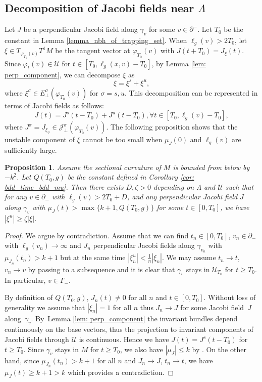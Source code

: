 \documentclass[10pt]{amsart}
\newcommand{\elg}{\ell_g}
\newtheorem{proposition}[theorem]{Proposition}
\theoremstyle{definition}
\let\phi\varphi
\renewcommand{\>}{{\rangle}}
\newcommand{\<}{{\langle}}
\begin{document}
\subsection{Decomposition of Jacobi fields near \texorpdfstring{$\Lambda$}{La}}

Let $J$ be a perpendicular Jacobi field along $\gamma_v$ for some $v\in\partial^-$. Let $T_0$ be the constant in Lemma \ref{lemma_nbh_of_trapping_set}. When $\elg(v)>2T_0$, let $\xi\in T_{\phi_{T_0}(v)}T^1M$ be the tangent vector at $\phi_{T_0}(v)$ with $J(t+T_0)=J_{\xi}(t)$. Since $\phi_{t}(v)\in \mathcal U$ for $t\in [T_0, \elg(x,v)-T_0]$, by Lemma \ref{lem: perp_component}, we can decompose $\xi$ as
\[
\xi=\xi^s+\xi^u,
\]
where $\xi^{\sigma}\in E^{\sigma}_{\perp}(\phi_{T_0}(v))$ for $\sigma= s,u$.
This decomposition can be represented in terms of Jacobi fields as follows:
\[
J(t)=J^s(t-T_0)+J^u(t-T_0), \forall t\in [T_0, \elg(v)-T_0],
\]
where $J^{\sigma}=J_{\xi_{\sigma}}\in \mathcal{J}^{\sigma}_{\perp}(\phi_{T_0}(v))$. The following proposition shows that the unstable component of $\xi$ cannot be too small when $\mu_J(0)$ and $\elg(v)$ are sufficiently large.

\begin{proposition}\label{prop: big_unstable_comp}
Assume the sectional curvature of $M$ is bounded from below by $-k^2$. Let $Q(T_0,g)$ be the constant defined in Corollary \ref{cor: bdd_time_bdd_mu}. Then there exists $D, \zeta>0$ depending on $\Lambda$ and $\mathcal{U}$ such that for any $v\in\partial_-$ with $\elg(v)>2T_0+D$, and any perpendicular Jacobi field $J$ along $\gamma_v$ with $\mu_J(t)>\max\{k+1, Q(T_0,g)\}$ for some $t\in[0,T_0]$, we have $|\xi^u|\geq \zeta |\xi|$.
\end{proposition}

\begin{proof}
We argue by contradiction. Assume that we can find $t_n\in[0,T_0]$, $v_n\in\partial_-$ with $\elg(v_n)\to\infty$ and $J_n$ perpendicular Jacobi fields along $\gamma_{v_n}$ with $\mu_{J_n}(t_n)>k+1$ but at the same time $|\xi^u_n|<\frac{1}{n} |\xi_n|$. We may assume $t_n\to t$, $v_n\to v$ by passing to a subsequence and it is clear that $\gamma_v$ stays in $\mathcal{U}_{T_0}$ for $t\geq T_0$. In particular, $v\in \Gamma_-$.

By definition of $Q(T_0,g)$, $J_n(t)\neq 0$ for all $n$ and $t\in[0,T_0]$. Without loss of generality we assume that $|\xi_n|=1$ for all $n$ thus $J_n\to J$ for some Jacobi field~$J$ along~$\gamma_v$. By~Lemma \ref{lem: perp_component} the invariant bundles depend continuously on the base vectors, thus the projection to invariant components of Jacobi fields through $\mathcal U$ is continuous. Hence we have $J(t)=J^s(t-T_0)$ for $t\geq T_0$. Since $\gamma_v$ stays in $M$ for $t\geq T_0$, we also have $|\mu_J|\leq k$ by \cite[Prop.\,2.11]{E73}. On the other hand, since $\mu_{J_n}(t_n)>k+1$ for all $n$ and $J_n\to J$, $t_n\to t$, we have $\mu_{J}(t)\geq k+1>k$ which provides a contradiction.
\end{proof}
\end{document}
